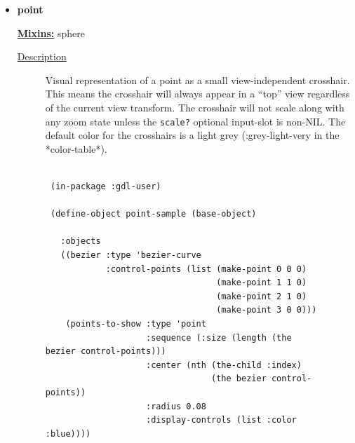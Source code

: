 \documentclass [11pt]{book}
\begin{document}
\begin{itemize}







\item {}
\label{prim:point}
\textbf{point}


\textbf{
\underline{Mixins:}} sphere





\begin{description}

\item [
\underline{Description}]


Visual representation of a point as a small view-independent crosshair. This means
the crosshair will always appear in a ``top'' view regardless of the current view transform. The crosshair will
not scale along with any zoom state unless the \texttt{scale?} optional input-slot is non-NIL. The default
color for the crosshairs is a light grey (:grey-light-very in the *color-table*).



\end{description}




\begin{figure}
\begin{lrbox}{\boxedverb}
\begin{minipage}{\linewidth}
{\small

\begin{verbatim}

 (in-package :gdl-user)

 (define-object point-sample (base-object)
   
   :objects
   ((bezier :type 'bezier-curve
            :control-points (list (make-point 0 0 0)
                                  (make-point 1 1 0)
                                  (make-point 2 1 0)
                                  (make-point 3 0 0)))
    (points-to-show :type 'point
                    :sequence (:size (length (the bezier control-points)))
                    :center (nth (the-child :index) 
                                 (the bezier control-points))
                    :radius 0.08
                    :display-controls (list :color :blue))))


\end{verbatim}}
\end{minipage}
\end{lrbox}
\end{figure}
\end{itemize}
\end{document}
